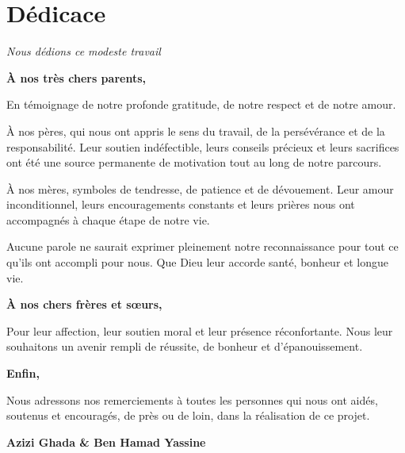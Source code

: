 \chapter*{Dédicace}

\begin{center}
\textit{Nous dédions ce modeste travail}
\end{center}

\vspace{0.5cm}

\noindent
\textbf{À nos très chers parents,}

\vspace{0.3cm}

En témoignage de notre profonde gratitude, de notre respect et de notre amour.

À nos pères, qui nous ont appris le sens du travail, de la persévérance et de la responsabilité. Leur soutien indéfectible, leurs conseils précieux et leurs sacrifices ont été une source permanente de motivation tout au long de notre parcours.

À nos mères, symboles de tendresse, de patience et de dévouement. Leur amour inconditionnel, leurs encouragements constants et leurs prières nous ont accompagnés à chaque étape de notre vie.

Aucune parole ne saurait exprimer pleinement notre reconnaissance pour tout ce qu’ils ont accompli pour nous. Que Dieu leur accorde santé, bonheur et longue vie.

\vspace{0.5cm}

\noindent
\textbf{À nos chers frères et sœurs,}

\vspace{0.3cm}

Pour leur affection, leur soutien moral et leur présence réconfortante. Nous leur souhaitons un avenir rempli de réussite, de bonheur et d’épanouissement.

\vspace{0.5cm}

\noindent
\textbf{Enfin,}

Nous adressons nos remerciements à toutes les personnes qui nous ont aidés, soutenus et encouragés, de près ou de loin, dans la réalisation de ce projet.

\vfill

\begin{flushright}
\textbf{Azizi Ghada \& Ben Hamad Yassine}
\end{flushright}